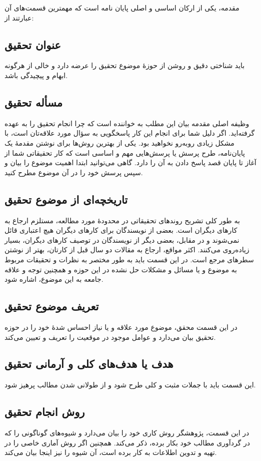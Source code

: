 مقدمه، یکی از ارکان اساسی و اصلی پایان نامه است که مهمترین قسمت‌های آن عبارتند از: 

\subsection{عنوان تحقیق} 
باید شناختی دقیق و روشن از حوزهٔ موضوع تحقیق را عرضه دارد و خالی از هرگونه ابهام و پیچیدگی باشد.

\subsection{مسأله تحقیق}
وظیفه اصلی مقدمه بیان این مطلب به خواننده است که چرا انجام تحقیق را به عهده گرفته‌اید. اگر دلیل شما برای انجام این کار پاسخگویی به سؤال مورد علاقه‌تان است، با مشکل زیادی روبه‌رو نخواهید بود. یکی از بهترین روش‌ها برای نوشتن مقدمهٔ یک پایان‌نامه، طرح پرسش یا پرسش‌هایی مهم و اساسی است که کار تحقیقاتی شما از آغاز تا پایان قصد پاسخ دادن به آن را دارد. گاهی می‌توانید ابتدا اهمیت موضوع را بیان و سپس پرسش خود را در آن موضوع مطرح کنید.

\subsection{تاریخچه‌ای از موضوع تحقیق}
به طور کلی تشریح روندهای تحقیقاتی در محدودهٔ مورد مطالعه، مستلزم ارجاع به کارهای دیگران است. بعضی از نویسندگان برای کارهای دیگران هیچ اعتباری قائل نمی‌شوند و در مقابل، بعضی دیگر از نویسندگان در توصیف کارهای دیگران، بسیار زیاده‌روی می‌کنند. اکثر مواقع، ارجاع به مقالات دو سال قبل از کارتان، بهتر از نوشتن سطرهای مرجع است. در این قسمت باید به طور مختصر به نظرات و تحقیقات مربوط به موضوع و یا مسائل و مشکلات حل نشده در این حوزه و همچنین توجه و علاقه جامعه به این موضوع، اشاره شود.

\subsection{تعریف موضوع تحقیق}
در این قسمت محقق، موضوع مورد علاقه و یا نیاز احساس شدهٔ خود را در حوزه تحقیق بیان می‌دارد و عوامل موجود در موقعیت را تعریف و تعیین می‌کند.

\subsection{هدف یا هدف‌های کلی و آرمانی تحقیق}
این قسمت باید با جملات مثبت و کلی طرح شود و از طولانی شدن مطالب پرهیز شود.

\subsection{روش انجام تحقیق}
در این قسمت، پژوهشگر روش کاری خود را بیان می‌دارد و شیوه‌های گوناگونی را که در گردآوری مطالب خود بکار برده، ذکر می‌کند. همچنین اگر روش آماری خاصی را در تهیه و تدوین اطلاعات به کار برده است، آن شیوه را نیز اینجا بیان می‌کند.

